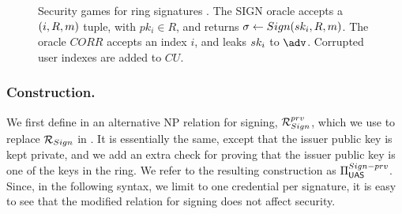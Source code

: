 \begin{figure}[ht!]
  \centering
  \caption{Security games for ring signatures \cite{bkm06}. The SIGN oracle
    accepts a $(i,R,m)$ tuple, with $pk_i \in R$, and
    returns $\sigma \gets Sign(sk_i,R,m)$. The oracle $CORR$ accepts an
    index $i$, and leaks $sk_i$ to $\adv$. Corrupted user indexes are
    added to $CU$.}
  \label{fig:model-rs}  
\end{figure}


\subsubsection{\CUASRing Construction.} %
We first define in  an alternative NP relation for signing,
$\mathcal{R}_{Sign}^{prv}$, which we use to replace $\mathcal{R}_{Sign}$ in \CUASGen.
It is essentially the same, except that the issuer public key is kept private,
and we add an extra check for proving that the issuer public key is one of the
keys in the ring. We refer to the resulting \CUASGen construction as
$\Pi_{\mathsf{UAS}}^{Sign-prv}$. Since, in the following syntax, we limit to one
credential per signature, it is easy to see that the modified relation for
signing does not affect security.

